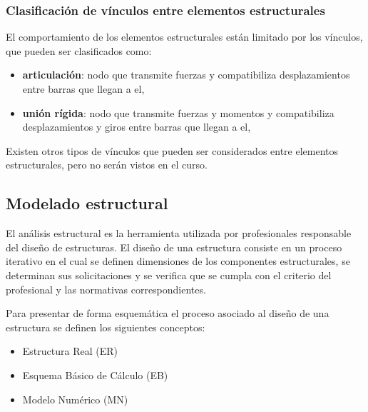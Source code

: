 \subsubsection{Clasificación de vínculos entre elementos estructurales}

El comportamiento de los elementos estructurales están limitado por los vínculos, que pueden ser clasificados como:
%
\begin{itemize}
\item \textbf{articulación}: nodo que transmite fuerzas y compatibiliza desplazamientos entre barras que llegan a el,
\item \textbf{unión rígida}: nodo que transmite fuerzas y momentos y compatibiliza desplazamientos y giros entre barras que llegan a el,
\end{itemize}

Existen otros tipos de vínculos que pueden ser considerados entre elementos estructurales, pero no serán vistos en el curso.













\subsection{Modelado estructural}

El análisis estructural es la herramienta utilizada por profesionales responsable del diseño de estructuras. %
%
El diseño de una estructura consiste en un proceso iterativo en el cual se definen dimensiones de los componentes estructurales, se determinan sus solicitaciones y se verifica que se cumpla con el criterio del profesional y las normativas correspondientes. %
%

Para presentar de forma esquemática el proceso asociado al diseño de una estructura se definen los siguientes conceptos:
%
\begin{itemize}
  \item Estructura Real (ER)
  \item Esquema Básico de Cálculo (EB)
  \item Modelo Numérico (MN)
\end{itemize}


